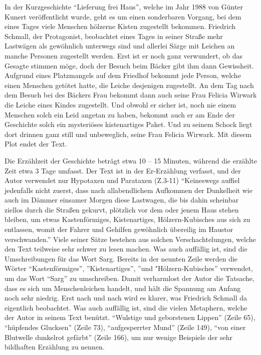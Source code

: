 In der Kurzgeschichte “Lieferung frei Haus”, welche im Jahr 1988 von Günter Kunert veröffentlicht wurde, geht es um einen sonderbaren Vorgang, bei dem eines Tages viele Menschen hölzerne Kisten zugestellt bekommen. Friedrich Schmall, der Protagonist, beobachtet eines Tages in seiner Straße mehr Lastwägen als gewöhnlich unterwegs sind und allerlei Särge mit Leichen an manche Personen zugestellt werden. Erst ist er noch ganz verwundert, ob das Gesagte stimmen möge, doch der Besuch beim Bäcker gibt ihm dann Gewissheit. Aufgrund eines Platzmangels auf dem Friedhof bekommt jede Person, welche einen Menschen getötet hatte, die Leiche desjenigen zugestellt. An dem Tag nach dem Besuch bei des Bäckers Frau bekommt dann auch seine Frau Felicia Wirwark die Leiche eines Kindes zugestellt. Und obwohl er sicher ist, noch nie einem Menschen solch ein Leid angetan zu haben, bekommt auch er am Ende der Geschichte solch ein mysteriöses kistenartiges Paket. Und zu seinem Schock liegt dort drinnen ganz still und unbeweglich, seine Frau Felicia Wirwark. Mit diesem Plot endet der Text. 

 

Die Erzählzeit der Geschichte beträgt etwa 10 – 15 Minuten, während die erzählte Zeit etwa 3 Tage umfasst. Der Text ist in der Er-Erzählung verfasst, und der Autor verwendet nur Hypotaxen und Parataxen (Z.3-11) “Keineswegs auffiel jedenfalls nicht zuerst, dass nach allabendlichem Aufkommen der Dunkelheit wie auch im Dämmer einsamer Morgen diese Lastwagen, die bis dahin scheinbar ziellos durch die Straßen gekurvt, plötzlich vor dem oder jenem Haus stehen bleiben, um etwas Kastenförmiges, Kistenartiges, Hölzern-Kubisches aus sich zu entlassen, womit der Fahrer und Gehilfen gewöhnlich übereilig im Haustor verschwanden.” Viele seiner Sätze bestehen aus solchen Verschachtelungen, welche den Text teilweise sehr schwer zu lesen machen. Was auch auffällig ist, sind die Umschreibungen für das Wort Sarg. Bereits in der neunten Zeile werden die Wörter “Kastenförmiges”, ”Kistenartiges”, ”und "Hölzern-Kubisches” verwendet, um das Wort “Sarg” zu umschreiben. Damit verharmlost der Autor die Tatsache, dass es sich um Menschenleichen handelt, und hält die Spannung am Anfang noch sehr niedrig. Erst nach und nach wird es klarer, was Friedrich Schmall da eigentlich beobachtet. Was auch auffällig ist, sind die vielen Metaphern, welche der Autor in seinem Text benützt. “Wulstige und geborstenen Lippen” (Zeile 65), “hüpfendes Glucksen” (Zeile 73), “aufgesperrter Mund” (Zeile 149), “von einer Blutwelle dunkelrot gefärbt” (Zeile 166), um nur wenige Beispiele der sehr bildhaften Erzählung zu nennen. 

